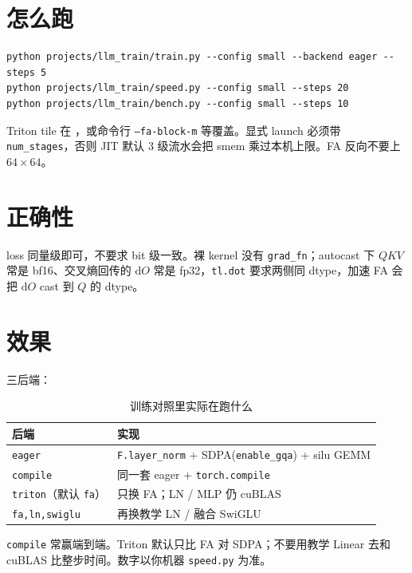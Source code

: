 \section{怎么跑}

\begin{runcmd}
\begin{lstlisting}[style=shell]
python projects/llm_train/train.py --config small --backend eager --steps 5
python projects/llm_train/speed.py --config small --steps 20
python projects/llm_train/bench.py --config small --steps 10
\end{lstlisting}
\end{runcmd}

Triton tile 在 ，或命令行 \texttt{--fa-block-m} 等覆盖。显式 launch 必须带 \texttt{num\_stages}，否则 JIT 默认 3 级流水会把 smem 乘过本机上限。FA 反向不要上 $64\times 64$。

\section{正确性}

\begin{note}
loss 同量级即可，不要求 bit 级一致。裸 kernel 没有 \texttt{grad\_fn}；autocast 下 $QKV$ 常是 bf16、交叉熵回传的 $\mathrm{d}O$ 常是 fp32，\texttt{tl.dot} 要求两侧同 dtype，加速 FA 会把 $\mathrm{d}O$ cast 到 $Q$ 的 dtype。
\end{note}

\section{效果}

三后端：

\begin{table}[htbp]
  \centering
  \caption{训练对照里实际在跑什么}
  \begin{tabular}{ll}
    \toprule
    后端 & 实现 \\
    \midrule
    \texttt{eager} & \texttt{F.layer\_norm} + SDPA(\texttt{enable\_gqa}) + silu GEMM \\
    \texttt{compile} & 同一套 eager + \texttt{torch.compile} \\
    \texttt{triton}（默认 \texttt{fa}） & 只换 FA；LN / MLP 仍 cuBLAS \\
    \texttt{fa,ln,swiglu} & 再换教学 LN / 融合 SwiGLU \\
    \bottomrule
  \end{tabular}
\end{table}

\begin{conclusion}
\texttt{compile} 常赢端到端。Triton 默认只比 FA 对 SDPA；不要用教学 Linear 去和 cuBLAS 比整步时间。数字以你机器 \texttt{speed.py} 为准。
\end{conclusion}

